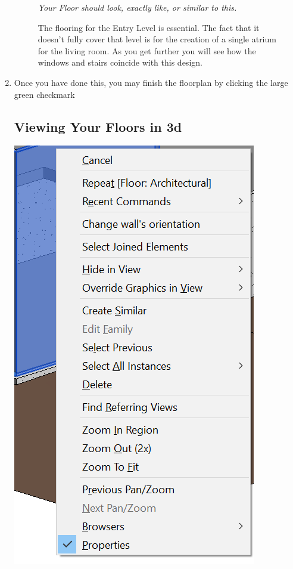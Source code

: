 \documentclass{tufte-book} %
\begin{document}
\begin{enumerate}
\begin{figure}
	\caption[Entry Level final floors]{The flooring for the Entry Level is essential. The fact that it doesn't fully cover that level is for the creation of a single atrium for the living room. As you get further you will see how the windows and stairs coincide with this design.}
	\emph{Your Floor should look, exactly like, or similar to this.}
	\end{figure}
	\item Once you have done this, you may finish the floorplan by clicking the large green checkmark
	
	\subsection{Viewing Your Floors in 3d}
	\begin{marginfigure}
		\includegraphics[width=\linewidth]{revit3dfloorcontext.png}

\end{marginfigure}
\end{enumerate}
\end{document}
